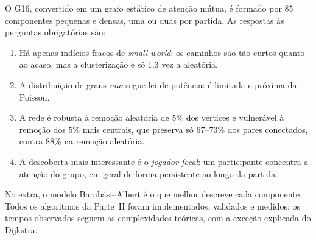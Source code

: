 \documentclass[sigconf]{acmart}
\begin{document}
O G16, convertido em um grafo estático de atenção mútua, é formado por 85 componentes pequenas e
densas, uma ou duas por partida. As respostas às perguntas obrigatórias são:
\begin{enumerate}
  \item Há apenas indícios fracos de \emph{small-world}: os caminhos são tão curtos quanto ao acaso,
  mas a clusterização é só 1,3 vez a aleatória.
  \item A distribuição de graus \emph{não} segue lei de potência: é limitada e próxima da Poisson.
  \item A rede é robusta à remoção aleatória de 5\% dos vértices e vulnerável à remoção dos 5\% mais
  centrais, que preserva só 67--73\% dos pares conectados, contra 88\% na remoção aleatória.
  \item A descoberta mais interessante é o \emph{jogador focal}: um participante concentra a atenção
  do grupo, em geral de forma persistente ao longo da partida.
\end{enumerate}
No extra, o modelo Barabási--Albert é o que melhor descreve cada componente. Todos os algoritmos da
Parte~II foram implementados, validados e medidos; os tempos observados seguem as complexidades
teóricas, com a exceção explicada do Dijkstra.



\end{document}
